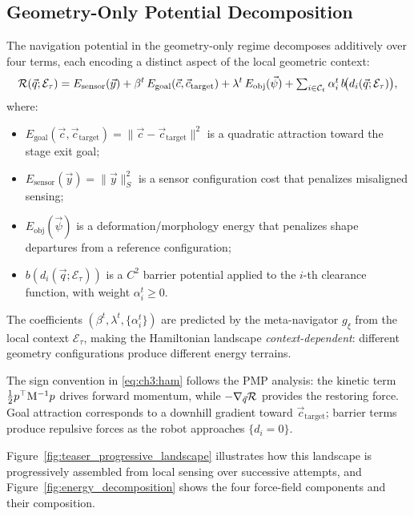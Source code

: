 \subsection{Geometry-Only Potential Decomposition}
\label{subsec:ch3:potential}

The navigation potential in the geometry-only regime decomposes additively
over four terms, each encoding a distinct aspect of the local
geometric context:
\begin{equation}
  \mathcal{R}(\vec{q};\mathcal{E}_\tau)
  = E_{\mathrm{sensor}}(\vec{y})
  + \beta^t\,E_{\mathrm{goal}}(\vec{c},\vec{c}_{\mathrm{target}})
  + \lambda^t\,E_{\mathrm{obj}}(\vec{\psi})
  + \textstyle\sum_{i \in \mathcal{C}_t}
      \alpha_i^t\,b\!\bigl(d_i(\vec{q};\mathcal{E}_\tau)\bigr),
  \label{eq:ch3:potential}
\end{equation}
where:
\begin{itemize}
  \item $E_{\mathrm{goal}}(\vec{c},\vec{c}_{\mathrm{target}})
         = \|\vec{c} - \vec{c}_{\mathrm{target}}\|^2$
        is a quadratic attraction toward the stage exit goal;
  \item $E_{\mathrm{sensor}}(\vec{y}) = \|\vec{y}\|_S^2$
        is a sensor configuration cost that penalizes misaligned sensing;
  \item $E_{\mathrm{obj}}(\vec{\psi})$ is a deformation/morphology energy
        that penalizes shape departures from a reference configuration;
  \item $b(d_i(\vec{q};\mathcal{E}_\tau))$ is a $C^2$ barrier potential
        applied to the $i$-th clearance function, with weight
        $\alpha_i^t \geq 0$.
\end{itemize}
The coefficients $(\beta^t, \lambda^t, \{\alpha_i^t\})$ are predicted by
the meta-navigator $g_\xi$ from the local context $\mathcal{E}_\tau$,
making the Hamiltonian landscape \emph{context-dependent}: different
geometry configurations produce different energy terrains.

The sign convention in \cref{eq:ch3:ham} follows the PMP analysis:
the kinetic term $\frac{1}{2}p^\top\mathrm{M}^{-1}p$ drives forward momentum,
while $-\nabla_{\vec{q}}\mathcal{R}$ provides the restoring force.
Goal attraction corresponds to a downhill gradient toward
$\vec{c}_{\mathrm{target}}$; barrier terms produce repulsive forces
as the robot approaches $\{d_i = 0\}$.



Figure~\ref{fig:teaser_progressive_landscape} illustrates how this
landscape is progressively assembled from local sensing over successive
attempts, and Figure~\ref{fig:energy_decomposition} shows the four
force-field components and their composition.

